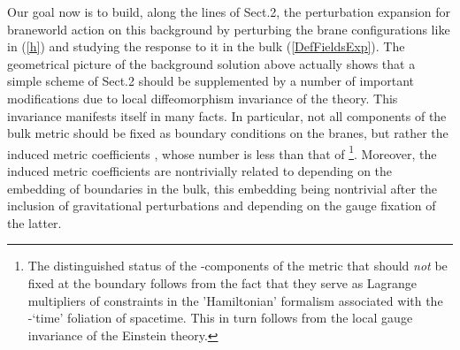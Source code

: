 \documentclass[a4paper,12pt]{article}
\begin{document}
Our goal now is to build, along the lines of Sect.2, the
perturbation expansion for braneworld action on this background by
perturbing the brane configurations like in (\ref{h}) and studying
the response to it in the bulk (\ref{DefFieldsExp}). The
geometrical picture of the background solution above actually
shows that a simple scheme of Sect.2 should be supplemented by a
number of important modifications due to local diffeomorphism
invariance of the theory. This invariance manifests itself in many
facts. In particular, not all components of the bulk metric
\coordHE{} should be fixed as boundary conditions on the
branes, but rather the induced metric coefficients
\coordHE{}, whose number is less than that of
\coordHE{}\footnote{The distinguished status of the
\coordHE{}-components of the metric that should {\em not} be fixed
at the boundary \coordHE{} follows from the fact that they
serve as Lagrange multipliers of constraints in the 'Hamiltonian'
formalism associated with the \coordHE{}-`time' foliation of spacetime.
This in turn follows from the local gauge invariance of the
Einstein theory.}. Moreover, the induced metric coefficients are
nontrivially related to \coordHE{} depending on the embedding
of boundaries in the bulk, this embedding being nontrivial after
the inclusion of gravitational perturbations and depending on the
gauge fixation of the latter.
\end{document}
